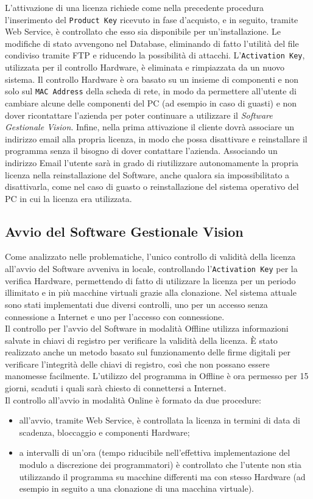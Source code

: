 L'attivazione di una licenza richiede come nella precedente procedura l'inserimento del \texttt{Product Key} ricevuto in fase d'acquisto, e in seguito, tramite Web Service, è controllato che esso sia disponibile per un'installazione. Le modifiche di stato avvengono nel Database, eliminando di fatto l'utilità del file condiviso tramite FTP e riducendo la possibilità di attacchi. L’\texttt{Activation Key}, utilizzata per il controllo Hardware, è eliminata e rimpiazzata da un nuovo sistema. Il controllo Hardware è ora basato su un insieme di componenti e non solo sul \texttt{MAC Address} della scheda di rete, in modo da permettere all’utente di cambiare alcune delle componenti del PC (ad esempio in caso di guasti) e non dover ricontattare l’azienda per poter continuare a utilizzare il \textit{Software Gestionale Vision}. 
Infine, nella prima attivazione il cliente dovrà associare un indirizzo email alla propria licenza, in modo che possa disattivare e reinstallare il programma senza il bisogno di dover contattare l’azienda. Associando un indirizzo Email l'utente sarà in grado di riutilizzare autonomamente la propria licenza nella reinstallazione del Software, anche qualora sia impossibilitato a disattivarla, come nel caso di guasto o reinstallazione del sistema operativo del PC in cui la licenza era utilizzata.


\subsection{Avvio del Software Gestionale Vision}

Come analizzato nelle problematiche, l'unico controllo di validità della licenza all'avvio del Software avveniva in locale, controllando l'\texttt{Activation Key} per la verifica Hardware, permettendo di fatto di utilizzare la licenza per un periodo illimitato e in più macchine virtuali grazie alla clonazione. Nel sistema attuale sono stati implementati due  diversi controlli, uno per un accesso senza connessione a Internet e uno per l’accesso con connessione.
\\
Il controllo per l’avvio del Software in modalità Offline utilizza informazioni salvate in chiavi di registro per verificare la validità della licenza. È stato realizzato anche un metodo basato sul funzionamento delle firme digitali per verificare l’integrità delle chiavi di registro, così che non possano essere manomesse facilmente. L’utilizzo del programma in Offline è ora permesso per 15 giorni, scaduti i quali sarà chiesto di connettersi a Internet.
\\
Il controllo all'avvio in modalità Online è formato da due procedure:
\begin{itemize}
\item all'avvio, tramite Web Service, è controllata la licenza in termini di data di scadenza, bloccaggio e componenti Hardware;
\item a intervalli di un'ora (tempo riducibile nell'effettiva implementazione del modulo a discrezione dei programmatori) è controllato che l'utente non stia utilizzando il programma su macchine differenti ma con stesso Hardware (ad esempio in seguito a una clonazione di una macchina virtuale).

\end{itemize}


